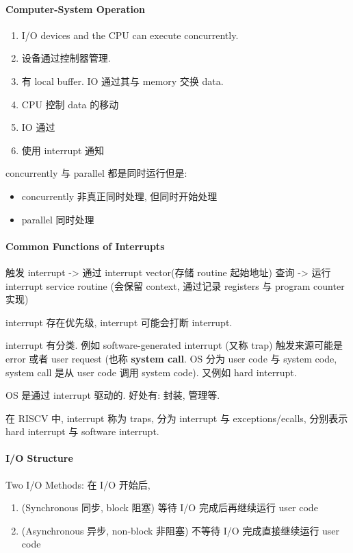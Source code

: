 \paragraph{Computer-System Operation}\quad

\begin{enumerate}%
    \item I/O devices and the CPU can execute concurrently. 
    \item 设备通过控制器管理. 
    \item 有 local buffer. IO 通过其与 memory 交换 data. 
    \item CPU 控制 data 的移动
    \item IO 通过
    \item 使用 interrupt 通知
\end{enumerate}


concurrently 与 parallel 都是同时运行但是:
\begin{itemize}
    \item concurrently 非真正同时处理, 但同时开始处理
    \item parallel 同时处理
\end{itemize}

\paragraph{Common Functions of Interrupts}触发 interrupt -> 通过 interrupt vector(存储 routine 起始地址) 查询 -> 运行 interrupt service routine (会保留 context, 通过记录 registers 与 program counter 实现)

interrupt 存在优先级, interrupt 可能会打断 interrupt. 

interrupt 有分类. 例如 software-generated interrupt (又称 trap) 触发来源可能是 error 或者 user request (也称 \textbf{system call}. OS 分为 user code 与 system code, system call 是从 user code 调用 system code). 又例如 hard interrupt. 

OS 是通过 interrupt 驱动的. 好处有: 封装, 管理等. 

在 RISCV 中, interrupt 称为 traps, 分为 interrupt 与 exceptions/ecalls, 分别表示 hard interrupt 与 software interrupt. 

\paragraph{I/O Structure}Two I/O Methods: 在 I/O 开始后,
\begin{enumerate}
    \item (Synchronous 同步, block 阻塞) 等待 I/O 完成后再继续运行 user code 
    \item (Asynchronous 异步, non-block 非阻塞) 不等待 I/O 完成直接继续运行 user code
\end{enumerate}

